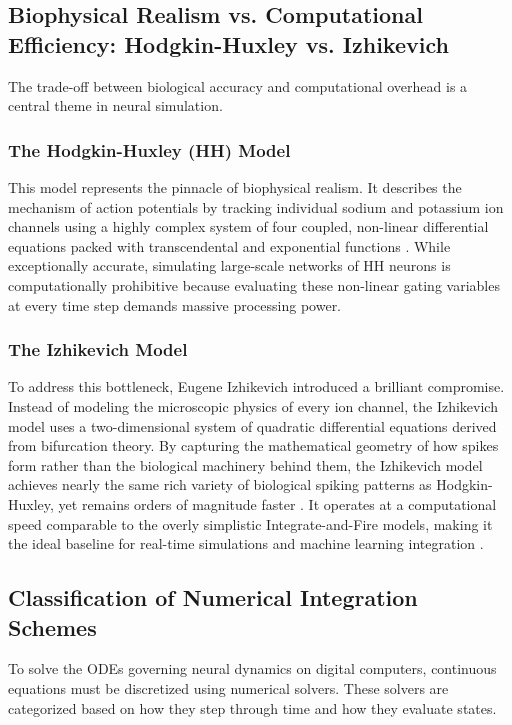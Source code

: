 \documentclass[conference]{IEEEtran}
\begin{document}
\subsection{Biophysical Realism vs. Computational Efficiency: Hodgkin-Huxley vs. Izhikevich}
The trade-off between biological accuracy and computational overhead is a central theme in neural simulation.

\subsubsection{The Hodgkin-Huxley (HH) Model}
This model represents the pinnacle of biophysical realism. It describes the mechanism of action potentials by tracking individual sodium and potassium ion channels using a highly complex system of four coupled, non-linear differential equations packed with transcendental and exponential functions \cite{schiesser}. While exceptionally accurate, simulating large-scale networks of HH neurons is computationally prohibitive because evaluating these non-linear gating variables at every time step demands massive processing power.

\subsubsection{The Izhikevich Model}
To address this bottleneck, Eugene Izhikevich introduced a brilliant compromise. Instead of modeling the microscopic physics of every ion channel, the Izhikevich model uses a two-dimensional system of quadratic differential equations derived from bifurcation theory. By capturing the mathematical geometry of how spikes form rather than the biological machinery behind them, the Izhikevich model achieves nearly the same rich variety of biological spiking patterns as Hodgkin-Huxley, yet remains orders of magnitude faster \cite{soltanipour}. It operates at a computational speed comparable to the overly simplistic Integrate-and-Fire models, making it the ideal baseline for real-time simulations and machine learning integration \cite{soltanipour}.

\subsection{Classification of Numerical Integration Schemes}
To solve the ODEs governing neural dynamics on digital computers, continuous equations must be discretized using numerical solvers. These solvers are categorized based on how they step through time and how they evaluate states.
\end{document}
